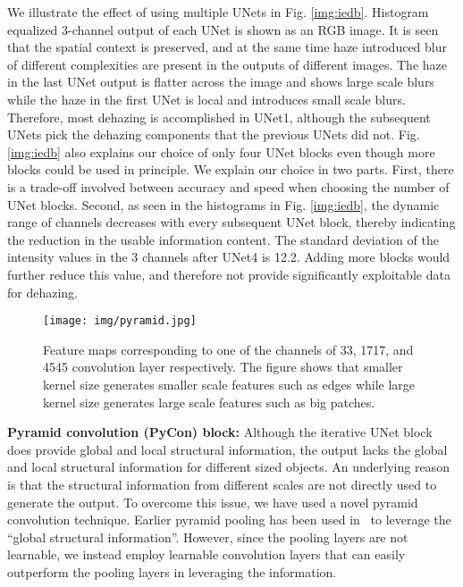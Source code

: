 \documentclass[runningheads]{llncs}
\begin{document}
We illustrate the effect of using multiple UNets in Fig. \ref{img:iedb}. Histogram equalized 3-channel output of each UNet is shown as an RGB image. It is seen that the spatial context is preserved, and at the same time haze introduced blur of different complexities are present in the outputs of different images. The haze in the last UNet output is flatter across the image and shows large scale blurs while the haze in the first UNet is local and introduces small scale blurs. Therefore, most dehazing is accomplished in UNet1, although the subsequent UNets pick the dehazing components that the previous UNets did not. Fig. \ref{img:iedb} also explains our choice of only four UNet blocks even though more blocks could be used in principle. We explain our choice in two parts. First, there is a trade-off involved between accuracy and speed when choosing the number of UNet blocks. Second, as seen in the histograms in Fig. \ref{img:iedb}, the dynamic range of channels decreases with every subsequent UNet block, thereby indicating the reduction in the usable information content. The standard deviation of the intensity values in the 3 channels after UNet4 is 12.2. Adding more blocks would further reduce this value, and therefore not provide significantly exploitable data for dehazing. 

\begin{figure*}[t]
\centering
\texttt{[image: img/pyramid.jpg]}
\caption{Feature maps corresponding to one of the channels of 33, 1717, and 4545 convolution layer respectively. The figure shows that smaller kernel size generates smaller scale features such as edges while large kernel size generates large scale features such as big patches.}
\label{img:newfig}
\end{figure*}

 
{\textbf{Pyramid convolution (PyCon) block:}} 
Although the iterative UNet block does provide global and local structural information, the output lacks the global and local structural information for different sized objects. An underlying reason is that the structural information from different scales are not directly used to generate the output.  To overcome this issue, we have used a novel pyramid convolution technique. Earlier pyramid pooling has been used in~\cite{ronneberger2015u} to leverage the “global structural information”. However, since the pooling layers are not learnable, we instead employ learnable convolution layers that can easily outperform the pooling layers in leveraging the information. 
\end{document}
